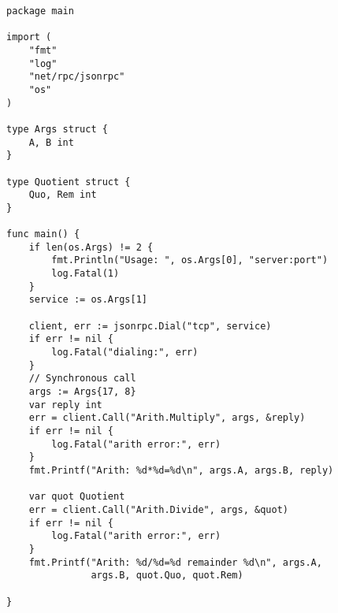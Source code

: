 \begin{lstlisting}[numbers=none]
package main

import (
    "fmt"
    "log"
    "net/rpc/jsonrpc"
    "os"
)

type Args struct {
    A, B int
}

type Quotient struct {
    Quo, Rem int
}

func main() {
    if len(os.Args) != 2 {
        fmt.Println("Usage: ", os.Args[0], "server:port")
        log.Fatal(1)
    }
    service := os.Args[1]

    client, err := jsonrpc.Dial("tcp", service)
    if err != nil {
        log.Fatal("dialing:", err)
    }
    // Synchronous call
    args := Args{17, 8}
    var reply int
    err = client.Call("Arith.Multiply", args, &reply)
    if err != nil {
        log.Fatal("arith error:", err)
    }
    fmt.Printf("Arith: %d*%d=%d\n", args.A, args.B, reply)

    var quot Quotient
    err = client.Call("Arith.Divide", args, &quot)
    if err != nil {
        log.Fatal("arith error:", err)
    }
    fmt.Printf("Arith: %d/%d=%d remainder %d\n", args.A,
               args.B, quot.Quo, quot.Rem)

}
\end{lstlisting}
